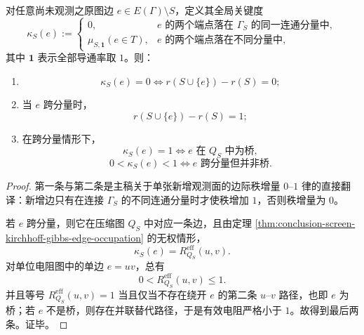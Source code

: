 \begin{corollary}\label{cor:conclusion-screen-zero-one-local-law-effective-resistance}
对任意尚未观测之原图边 \(e\in E(\Gamma)\setminus S\)，定义其全局关键度
\[
\kappa_S(e)
:=
\begin{cases}
0, & e \text{ 的两个端点落在 }\Gamma_S\text{ 的同一连通分量中},\\[4pt]
\mu_{S,\mathbf 1}(e\in T), & e \text{ 的两个端点落在不同分量中},
\end{cases}
\]
其中 \(\mathbf 1\) 表示全部导通率取 \(1\)。则：
\begin{enumerate}
  \item
  \[
  \kappa_S(e)=0
  \iff
  r(S\cup\{e\})-r(S)=0;
  \]
  \item 当 \(e\) 跨分量时，
  \[
  r(S\cup\{e\})-r(S)=1;
  \]
  \item 在跨分量情形下，
  \[
  \kappa_S(e)=1
  \iff
  e \text{ 在 }Q_S\text{ 中为桥},
  \]
  \[
  0<\kappa_S(e)<1
  \iff
  e \text{ 跨分量但并非桥}.
  \]
\end{enumerate}
\end{corollary}
\begin{proof}
第一条与第二条是主稿关于单张新增观测面的边际秩增量 \(0\text{--}1\) 律的直接翻译：新增边只有在连接 \(\Gamma_S\) 的不同连通分量时才使秩增加 \(1\)，否则秩增量为 \(0\)。

若 \(e\) 跨分量，则它在压缩图 \(Q_S\) 中对应一条边，且由定理 \ref{thm:conclusion-screen-kirchhoff-gibbs-edge-occupation} 的无权情形，
\[
\kappa_S(e)=R^{\mathrm{eff}}_{Q_S}(u,v).
\]
对单位电阻图中的单边 \(e=uv\)，总有
\[
0<R^{\mathrm{eff}}_{Q_S}(u,v)\le 1.
\]
并且等号 \(R^{\mathrm{eff}}_{Q_S}(u,v)=1\) 当且仅当不存在绕开 \(e\) 的第二条 \(u\)--\(v\) 路径，也即 \(e\) 为桥；若 \(e\) 不是桥，则存在并联替代路径，于是有效电阻严格小于 \(1\)。故得到最后两条。证毕。
\end{proof}

